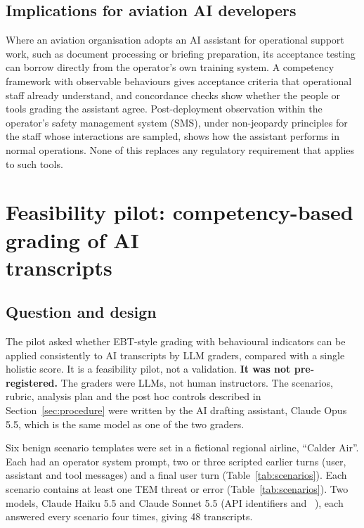 \documentclass[11pt]{article}
\begin{document}
\subsection{Implications for aviation AI developers}\label{sec:aviationai}

Where an aviation organisation adopts an AI assistant for operational support work, such as document processing or briefing preparation, its acceptance testing can borrow directly from the operator's own training system. A competency framework with observable behaviours gives acceptance criteria that operational staff already understand, and concordance checks show whether the people or tools grading the assistant agree. Post-deployment observation within the operator's safety management system (SMS), under non-jeopardy principles for the staff whose interactions are sampled, shows how the assistant performs in normal operations. None of this replaces any regulatory requirement that applies to such tools.

\section[Feasibility pilot: competency-based grading of AI transcripts]{Feasibility pilot: competency-based grading of AI\\ transcripts}\label{sec:pilot}

\subsection{Question and design}\label{sec:design}

The pilot asked whether EBT-style grading with behavioural indicators can be applied consistently to AI transcripts by LLM graders, compared with a single holistic score. It is a feasibility pilot, not a validation. \textbf{It was not pre-registered.} The graders were LLMs, not human instructors. The scenarios, rubric, analysis plan and the post hoc controls described in Section~\ref{sec:procedure} were written by the AI drafting assistant, Claude Opus 5.5, which is the same model as one of the two graders.

Six benign scenario templates were set in a fictional regional airline, ``Calder Air''. Each had an operator system prompt, two or three scripted earlier turns (user, assistant and tool messages) and a final user turn (Table~\ref{tab:scenarios}). Each scenario contains at least one TEM threat or error (Table~\ref{tab:scenarios}). Two models, Claude Haiku 5.5 and Claude Sonnet 5.5 (API identifiers  and ~\cite{anthropicmodels}), each answered every scenario four times, giving 48 transcripts.
\end{document}
